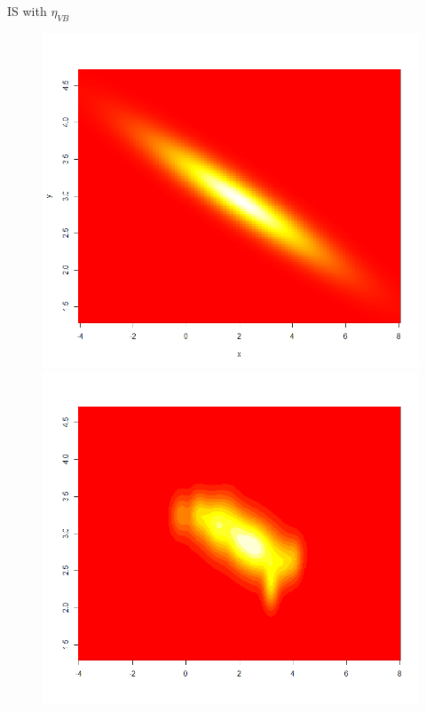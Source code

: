 \begin{frame}{IS with $\eta_{VB}$}

\begin{figure}
   \begin{minipage}[c]{.46\linewidth}
 \includegraphics[width=\textwidth]{figures/post_2D_true.png}
   \end{minipage} \hfill
   \begin{minipage}[c]{.46\linewidth}
  \includegraphics[width=\textwidth]{figures/post_2D_IS_VBEM.png}

\end{minipage}
\end{figure}
\end{frame}
